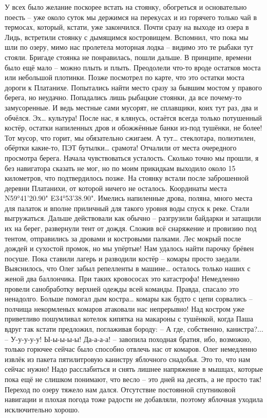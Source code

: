 У всех было желание поскорее встать на стоянку, обогреться и основательно поесть – уже около суток мы держимся на перекусах и из горячего только чай в термосах, который, кстати, уже закончился. Почти сразу на выходе из озера в Лидь, встретили стоянку с дымящимся костровищем. Вспомнил, что пока мы шли по озеру, мимо нас пролетела моторная лодка – видимо это те рыбаки тут стояли. Бригаде стоянка не понравилась, пошли дальше. В принципе, времени было ещё мало – можно плыть и плыть. Преодолели что-то вроде остатков моста или небольшой плотинки. Позже посмотрел по карте, что это остатки моста дороги к Платанихе. Попытались найти место сразу за бывшим мостом у правого берега, но неудачно. Попадались лишь рыбацкие стоянки, да все почему-то замусоренные. И ведь местные сами мусорят, не сплавщики, коих тут раз, два и обчёлся. Эх… культура! После нас, я клянусь, остаётся всегда только потушенный костёр, остатки напиленных дров и обожжённые банки из-под тушёнки, не более! Тот мусор, что горит, мы обязательно сжигаем. А тут… стеклотара, полиэтилен, обёртки какие-то, ПЭТ бутылки… срамота! 
Отчалили от места очередного просмотра берега. Начала чувствоваться усталость. Сколько точно мы прошли, я без навигатора сказать не мог, но по моим прикидкам выходило около 15 километров, что подтвердилось позже. На стоянку встали после заброшенной деревни Платанихи, от которой ничего не осталось. Координаты места N59°41'20.90" E34°53'38.90". Имелись напиленные дрова, поляна, много места для палаток и вполне приличный для такого уровня воды спуск к реке. Стали выгружаться. 
Дальше действовали как обычно – разгрузили байдарки и затащили их на берег, развернули тент от дождя. Сложив всё снаряжение и провизию под тентом, отправились за дровами и костровыми палками. Лес мокрый после дождей и сухостой промок, но мы упёртые! Нам удалось найти парочку брёвен посуше. 
Пока ставили лагерь и разводили костёр – комары просто заедали. Выяснилось, что Олег забыл репелленты в машине… осталось только наших с женой два баллончика. При таких кровососах это катастрофа! Немедленно провели санобработку верхней одежды всей команды. Правда, спасало это ненадолго. Больше помогал дым костра… комары как будто с цепи сорвались – полчища некормленых комаров атаковали нас непрерывно!
Над костром уже приветливо пошумливал котелок кипятка на макароны с тушёнкой, когда Паша вдруг так кстати предложил, поглаживая бороду: 
– А где, собственно, канистра?...
– У-у-у-у-у! Ы-ы-ы-ы-ы! Да-а-а-а! – завопила походная братия, ибо, возможно, только горючее сейчас было способно отвлечь нас от комаров. 
Олег немедленно извлёк из пакета пятилитровую канистру яблочного снадобья. Это то, что нам сейчас нужно! Надо расслабиться и снять лишнее напряжение в мышцах, которые пока ещё не слишком понимают, что весло  – это дней на десять, а не просто так! Переход по озеру тяжело нам дался. Отсутствие постоянной спутниковой навигации и плохая погода тоже радости не добавляли, поэтому яблочная уходила исключительно хорошо.

